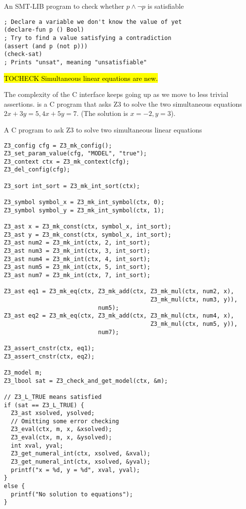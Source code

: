 \begin{program}
\caption{An SMT-LIB program to check whether $p \wedge \neg p$ is satisfiable}
\label{fig:smtlib-prop}
\begin{verbatim}
; Declare a variable we don't know the value of yet
(declare-fun p () Bool)
; Try to find a value satisfying a contradiction
(assert (and p (not p)))
(check-sat)
; Prints "unsat", meaning "unsatisfiable"
\end{verbatim}
\end{program}

\hl{TOCHECK Simultaneous linear equations are new.}

The complexity of the C interface keeps going up as we move to less trivial
assertions.  is a C program that asks Z3 to solve the
two simultaneous equations $2x + 3y = 5, 4x + 5y = 7$. (The solution is $x =
-2, y = 3$).

\begin{program}
\caption{A C program to ask Z3 to solve two simultaneous linear equations}
\label{fig:c-simultaneous}
\begin{verbatim}
Z3_config cfg = Z3_mk_config();
Z3_set_param_value(cfg, "MODEL", "true");
Z3_context ctx = Z3_mk_context(cfg);
Z3_del_config(cfg);

Z3_sort int_sort = Z3_mk_int_sort(ctx);

Z3_symbol symbol_x = Z3_mk_int_symbol(ctx, 0);
Z3_symbol symbol_y = Z3_mk_int_symbol(ctx, 1);

Z3_ast x = Z3_mk_const(ctx, symbol_x, int_sort);
Z3_ast y = Z3_mk_const(ctx, symbol_x, int_sort);
Z3_ast num2 = Z3_mk_int(ctx, 2, int_sort);
Z3_ast num3 = Z3_mk_int(ctx, 3, int_sort);
Z3_ast num4 = Z3_mk_int(ctx, 4, int_sort);
Z3_ast num5 = Z3_mk_int(ctx, 5, int_sort);
Z3_ast num7 = Z3_mk_int(ctx, 7, int_sort);

Z3_ast eq1 = Z3_mk_eq(ctx, Z3_mk_add(ctx, Z3_mk_mul(ctx, num2, x),
                                          Z3_mk_mul(ctx, num3, y)),
                           num5);
Z3_ast eq2 = Z3_mk_eq(ctx, Z3_mk_add(ctx, Z3_mk_mul(ctx, num4, x),
                                          Z3_mk_mul(ctx, num5, y)),
                           num7);

Z3_assert_cnstr(ctx, eq1);
Z3_assert_cnstr(ctx, eq2);

Z3_model m;
Z3_lbool sat = Z3_check_and_get_model(ctx, &m);

// Z3_L_TRUE means satisfied
if (sat == Z3_L_TRUE) {
  Z3_ast xsolved, ysolved;
  // Omitting some error checking
  Z3_eval(ctx, m, x, &xsolved);
  Z3_eval(ctx, m, x, &ysolved);
  int xval, yval;
  Z3_get_numeral_int(ctx, xsolved, &xval);
  Z3_get_numeral_int(ctx, xsolved, &yval);
  printf("x = %d, y = %d", xval, yval);
}
else {
  printf("No solution to equations");
}
\end{verbatim}
\end{program}

